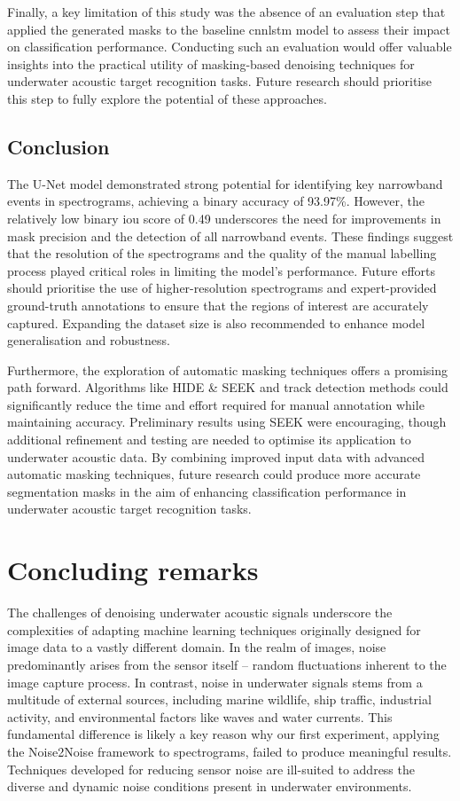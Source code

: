 Finally, a key limitation of this study was the absence of an evaluation step that applied the generated masks to the baseline \acrshort{cnnlstm} model to assess their impact on classification performance. Conducting such an evaluation would offer valuable insights into the practical utility of masking-based denoising techniques for underwater acoustic target recognition tasks. Future research should prioritise this step to fully explore the potential of these approaches.

\subsection{Conclusion}

The U-Net model demonstrated strong potential for identifying key narrowband events in spectrograms, achieving a binary accuracy of 93.97\%. However, the relatively low binary \acrshort{iou} score of 0.49 underscores the need for improvements in mask precision and the detection of all narrowband events. These findings suggest that the resolution of the spectrograms and the quality of the manual labelling process played critical roles in limiting the model's performance. Future efforts should prioritise the use of higher-resolution spectrograms and expert-provided ground-truth annotations to ensure that the regions of interest are accurately captured. Expanding the dataset size is also recommended to enhance model generalisation and robustness.

Furthermore, the exploration of automatic masking techniques offers a promising path forward. Algorithms like HIDE \& SEEK and track detection methods could significantly reduce the time and effort required for manual annotation while maintaining accuracy. Preliminary results using SEEK were encouraging, though additional refinement and testing are needed to optimise its application to underwater acoustic data. By combining improved input data with advanced automatic masking techniques, future research could produce more accurate segmentation masks in the aim of enhancing classification performance in underwater acoustic target recognition tasks.

\section{Concluding remarks}

The challenges of denoising underwater acoustic signals underscore the complexities of adapting machine learning techniques originally designed for image data to a vastly different domain. In the realm of images, noise predominantly arises from the sensor itself -- random fluctuations inherent to the image capture process. In contrast, noise in underwater signals stems from a multitude of external sources, including marine wildlife, ship traffic, industrial activity, and environmental factors like waves and water currents. This fundamental difference is likely a key reason why our first experiment, applying the Noise2Noise framework to spectrograms, failed to produce meaningful results. Techniques developed for reducing sensor noise are ill-suited to address the diverse and dynamic noise conditions present in underwater environments.

